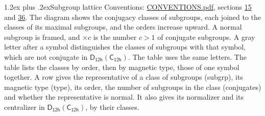 \documentclass[10pt,a4paper]{article}
\makeatletter
\renewcommand\section{\@startsection{section}{1}{\z@}{-3ex plus -1ex minus -.2ex}%
  {1.2ex plus .2ex}{\normalfont\large\sffamily\bfseries\color{parttitle}}}
\numberwithin{equation}{section}
\newcommand{\grp}[1]{\mathsf{#1}}
\makeatother
\begin{document}
\section{Subgroup lattice}\label{s:subgroups}
Conventions: \href{../../CONVENTIONS.pdf}{CONVENTIONS.pdf}, sections \href{../../../rotation/CONVENTIONS.pdf\#conv.15}{15} and \href{../../CONVENTIONS.pdf\#conv.36}{36}.
The diagram shows the conjugacy classes of subgroups, each joined to the classes of its maximal subgroups, and the orders increase upward. \label{n:index.conjugates.c}\label{n:mark.conjugates}A normal subgroup is framed, and ${\times}c$ is the number $c > 1$ of conjugate subgroups. \label{n:mark.letter}A gray letter after a symbol distinguishes the classes of subgroups with that symbol, which are not conjugate in $\grp{D_{12h}}(\grp{C_{12h}})$. The table uses the same letters. The table lists the classes by order, then by magnetic type, those of one symbol together. \label{n:head.subgroup}\label{n:head.magnetic.type}\label{n:head.order}\label{n:head.conjugates}\label{n:head.normal}A row gives the representative of a class of subgroups (subgrp), its magnetic type (type), its order, the number of subgroups in the class (conjugates) and whether the representative is normal. \label{n:head.normalizer}\label{n:head.centralizer}It also gives its normalizer and its centralizer in $\grp{D_{12h}}(\grp{C_{12h}})$, by their classes. 
\end{document}
